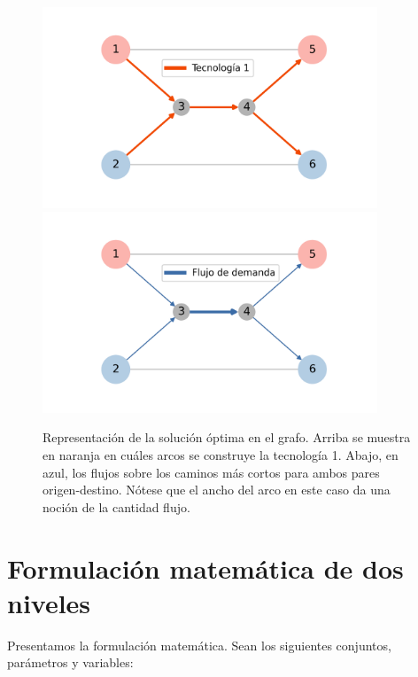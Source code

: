 \begin{figure}[h!]
  \centering
  \includegraphics[width=10cm]{../resources/example_1_infras.png}
  \includegraphics[width=10cm]{../resources/example_1_flows.png}
  \caption{Representación de la solución óptima en el grafo. Arriba se muestra en naranja en cuáles arcos se construye la tecnología 1. Abajo, en azul, los flujos sobre los caminos más cortos para ambos pares origen-destino. Nótese que el ancho del arco en este caso da una noción de la cantidad flujo.}
  \label{fig:example1solution}
\end{figure}

\FloatBarrier
\clearpage
\section{Formulación matemática de dos niveles}

Presentamos la formulación matemática. Sean los siguientes conjuntos, parámetros y variables:

